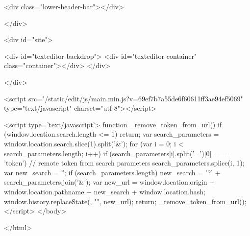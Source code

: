 <div class="lower-header-bar"></div>


</div>

<div id="site">


<div id="texteditor-backdrop">
<div id="texteditor-container" class="container"></div>
</div>


</div>






    


<script src="/static/edit/js/main.min.js?v=69ef7b7a55de6f60611ff3ae94ef5069" type="text/javascript" charset="utf-8"></script>


<script type='text/javascript'>
  function _remove_token_from_url() {
    if (window.location.search.length <= 1) {
      return;
    }
    var search_parameters = window.location.search.slice(1).split('&');
    for (var i = 0; i < search_parameters.length; i++) {
      if (search_parameters[i].split('=')[0] === 'token') {
        // remote token from search parameters
        search_parameters.splice(i, 1);
        var new_search = '';
        if (search_parameters.length) {
          new_search = '?' + search_parameters.join('&');
        }
        var new_url = window.location.origin + 
                      window.location.pathname + 
                      new_search + 
                      window.location.hash;
        window.history.replaceState({}, "", new_url);
        return;
      }
    }
  }
  _remove_token_from_url();
</script>
</body>

</html>